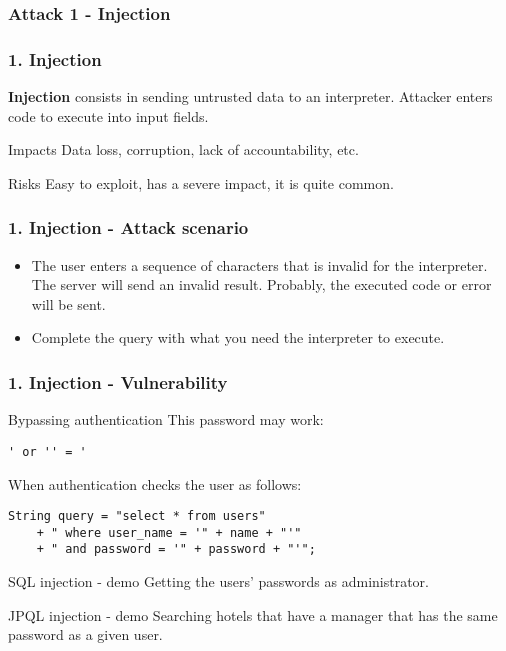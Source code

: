 
\subsubsection{Attack 1 - Injection}

\begin{frame}
\frametitle{1. Injection}
\textbf{Injection} consists in sending untrusted data to an interpreter.
Attacker enters code to execute into input fields.
\begin{block}{Impacts}
Data loss, corruption, lack of accountability, etc.
\end{block}
\begin{block}{Risks}
\alert{Easy to exploit}, has a \alert{severe impact}, it is quite common.
\end{block}
\end{frame}

\begin{frame}
\frametitle{1. Injection - Attack scenario}
\begin{itemize}
\item The user enters a sequence of characters that is invalid for the
	interpreter. The server will send an invalid result.
	Probably, the executed code or error will be sent.
\item Complete the query with what you need the interpreter to execute.
\end{itemize}
\end{frame}

\begin{frame}[fragile]
\frametitle{1. Injection - Vulnerability}
\begin{exampleblock}{Bypassing authentication}
This password may work:
\begin{lstlisting}
' or '' = '
\end{lstlisting}
When authentication checks the user as follows:
\begin{lstlisting}
String query = "select * from users"
	+ " where user_name = '" + name + "'"
	+ " and password = '" + password + "'";
\end{lstlisting}
\end{exampleblock}
\pause
\begin{exampleblock}{SQL injection - demo}
Getting the users' passwords as administrator.
\end{exampleblock}
\pause
\begin{exampleblock}{JPQL injection - demo}
Searching hotels that have a manager that has the same password as a given
user.
\end{exampleblock}
\end{frame}

